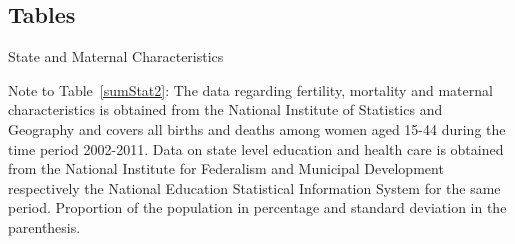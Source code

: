 \documentclass[a4paper, 11pt]{article}
\begin{document}
\begin{spacing}{2}


\section*{Tables}
\begin{table}[H]\caption{State and Maternal Characteristics}\label{sumStat2}
\begin{threeparttable}
{\small }
\begin{tablenotes}
{\footnotesize \item Note to Table~\ref{sumStat2}:	The data regarding fertility, mortality and maternal characteristics is obtained from the National Institute of Statistics and Geography and covers all births and deaths among women aged 15-44 during the time period 2002-2011. Data on state level education and health care is obtained from the National Institute for Federalism and Municipal Development respectively the National Education Statistical Information System for the same period. Proportion of the population in percentage and standard deviation in the parenthesis.}
\end{tablenotes}
\end{threeparttable}
\end{table}




\end{spacing}
\end{document}
